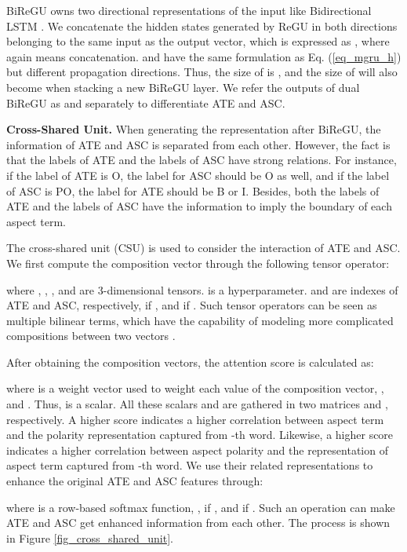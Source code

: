 \documentclass[11pt,a4paper]{article}
\begin{document}
	BiReGU owns two directional representations of the input like Bidirectional LSTM \cite{Graves2005b}. We concatenate the hidden states generated by ReGU in both directions belonging to the same input as the output vector, which is expressed as , where  again means concatenation.  and  have the same formulation as Eq. (\ref{eq_mgru_h}) but different propagation directions. Thus, the size of  is , and the size of  will also become  when stacking a new BiReGU layer. We refer the outputs of dual BiReGU as  and  separately to differentiate ATE and ASC.
	
	\vspace{+1.5mm}
	\noindent
	\textbf{Cross-Shared Unit.} \quad When generating the representation after BiReGU, the information of ATE and ASC is separated from each other. However, the fact is that the labels of ATE and the labels of ASC have strong relations. For instance, if the label of ATE is O, the label for ASC should be O  as well, and if the label of ASC is PO, the label for ATE should be B or I. Besides, both the labels of ATE and the labels of ASC have the information to imply the boundary of each aspect term.
	
	The cross-shared unit (CSU) is used to consider the interaction of ATE and ASC. We first compute the composition vector  through the following tensor operator:
	
	where , , , and  are 3-dimensional tensors.  is a hyperparameter.  and  are indexes of ATE and ASC, respectively,  if , and  if . Such tensor operators can be seen as multiple bilinear terms, which have the capability of modeling more complicated compositions between two vectors \cite{Socher2013,Wang2017}. 

	After obtaining the composition vectors, the attention score  is calculated as:
	
	where  is a weight vector used to weight each value of the composition vector, , and . Thus,  is a scalar. All these scalars  and  are gathered in two matrices  and , respectively. A higher score  indicates a higher correlation between aspect term  and the polarity representation captured from -th word. Likewise, a higher score  indicates a higher correlation between aspect polarity  and the representation of aspect term captured from -th word. We use their related representations to enhance the original ATE and ASC features through:
	
	where  is a row-based softmax function, ,  if , and  if . Such an operation can make ATE and ASC get enhanced information from each other. The process is shown in Figure \ref{fig_cross_shared_unit}.
\end{document}
